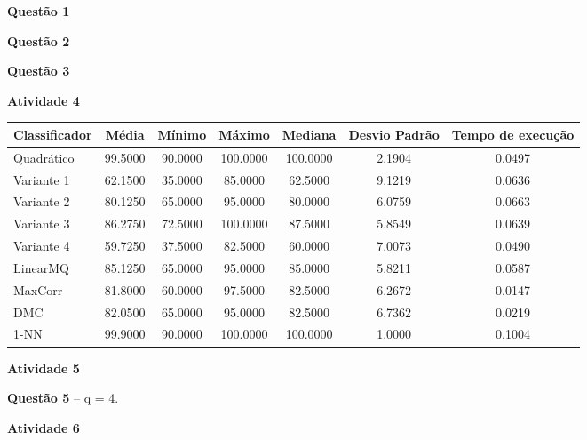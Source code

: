 \documentclass[12pt]{article}
\begin{document}
	\textbf{Questão 1}
	
	\textbf{Questão 2}
	
	\textbf{Questão 3}
	
	\hfill
	
	\textbf{Atividade 4}
	
	\hfill
	
	\begin{tabular}{lcccccc}
		\hline
		Classificador & Média & Mínimo & Máximo & Mediana & Desvio Padrão & Tempo de execução \\
		\hline
		Quadrático &     99.5000 &  90.0000 & 100.0000 & 100.0000 &   2.1904 &  0.0497 \\
		Variante 1 &     62.1500 &  35.0000 &  85.0000 &  62.5000 &   9.1219 &  0.0636 \\
		Variante 2 &     80.1250 &  65.0000 &  95.0000 &  80.0000 &   6.0759 &  0.0663 \\
		Variante 3 &     86.2750 &  72.5000 & 100.0000 &  87.5000 &   5.8549 &  0.0639 \\
		Variante 4 &     59.7250 &  37.5000 &  82.5000 &  60.0000 &   7.0073 &  0.0490 \\
		LinearMQ   &     85.1250 &  65.0000 &  95.0000 &  85.0000 &   5.8211 &  0.0587 \\
		MaxCorr    &     81.8000 &  60.0000 &  97.5000 &  82.5000 &   6.2672 &  0.0147 \\
		DMC        &     82.0500 &  65.0000 &  95.0000 &  82.5000 &   6.7362 &  0.0219 \\
		1-NN       &     99.9000 &  90.0000 & 100.0000 & 100.0000 &   1.0000 &  0.1004 \\
		\hline
	\end{tabular}
	
	\hfill
	
	\textbf{Atividade 5}
	
	\textbf{Questão 5} -- q = 4.
	
	\textbf{Atividade 6}
	
	\hfill
	
\end{document}
